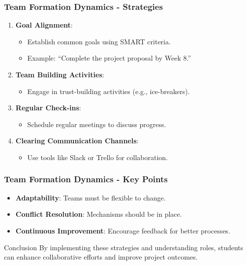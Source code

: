 \documentclass[aspectratio=169]{beamer}
\begin{document}
\begin{frame}[fragile]
    \frametitle{Team Formation Dynamics - Strategies}
    \begin{enumerate}
        \item \textbf{Goal Alignment}:
            \begin{itemize}
                \item Establish common goals using SMART criteria.
                \item Example: “Complete the project proposal by Week 8.”
            \end{itemize}
        
        \item \textbf{Team Building Activities}:
            \begin{itemize}
                \item Engage in trust-building activities (e.g., ice-breakers).
            \end{itemize}
        
        \item \textbf{Regular Check-ins}:
            \begin{itemize}
                \item Schedule regular meetings to discuss progress.
            \end{itemize}
        
        \item \textbf{Clearing Communication Channels}:
            \begin{itemize}
                \item Use tools like Slack or Trello for collaboration.
            \end{itemize}
    \end{enumerate}
\end{frame}

\begin{frame}[fragile]
    \frametitle{Team Formation Dynamics - Key Points}
    \begin{itemize}
        \item \textbf{Adaptability}: Teams must be flexible to change.
        \item \textbf{Conflict Resolution}: Mechanisms should be in place.
        \item \textbf{Continuous Improvement}: Encourage feedback for better processes.
    \end{itemize}
    \begin{block}{Conclusion}
        By implementing these strategies and understanding roles, students can enhance collaborative efforts and improve project outcomes.
    \end{block}
\end{frame}
\end{document}
